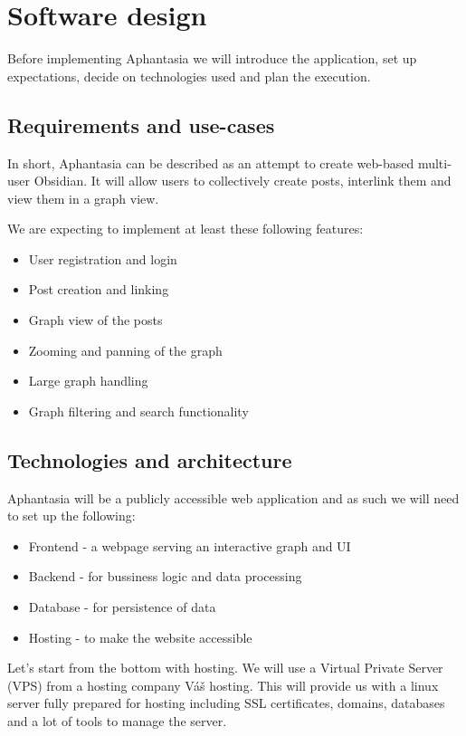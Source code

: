 \chapter{Software design}

Before implementing Aphantasia we will introduce the application, set up expectations, decide on technologies used and plan the execution.

\section{Requirements and use-cases}

In short, Aphantasia can be described as an attempt to create web-based multi-user Obsidian.
It will allow users to collectively create posts, interlink them and view them in a graph view.

We are expecting to implement at least these following features:
\begin{itemize}
  \item User registration and login
  \item Post creation and linking
  \item Graph view of the posts
  \item Zooming and panning of the graph
  \item Large graph handling
  \item Graph filtering and search functionality
\end{itemize}


\section{Technologies and architecture}

Aphantasia will be a publicly accessible web application and as such we will need to set up the following:
\begin{itemize}
  \item Frontend - a webpage serving an interactive graph and UI
  \item Backend - for bussiness logic and data processing
  \item Database - for persistence of data
  \item Hosting - to make the website accessible
\end{itemize}

Let's start from the bottom with hosting.
We will use a Virtual Private Server (VPS) from a hosting company Váš hosting.
This will provide us with a linux server fully prepared for hosting including
SSL certificates, domains, databases and a lot of tools to manage the server.

